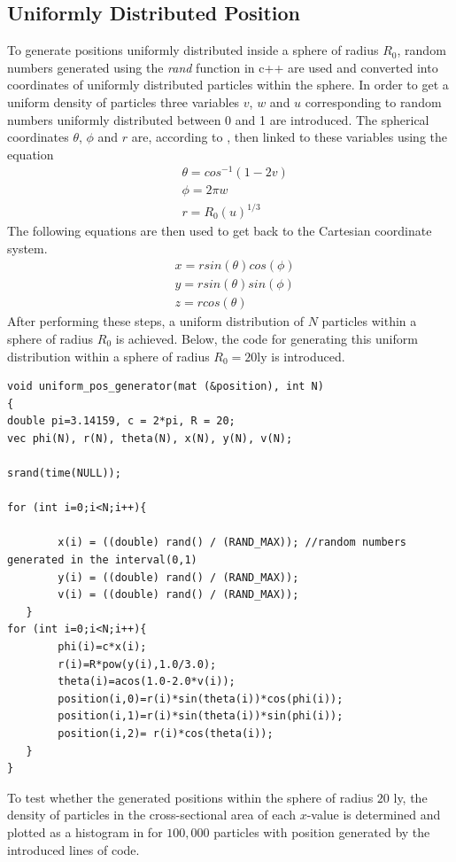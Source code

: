 \subsection{Uniformly Distributed Position}
To generate positions uniformly distributed inside a sphere of radius $R_0$, random numbers generated using the \textit{rand} function in c++ are used and converted into coordinates of uniformly distributed particles within the sphere. 
In order to get a uniform density of particles three variables $v$, $w$ and $u$ corresponding to random numbers uniformly distributed between 0 and 1 are introduced.
The spherical coordinates $\theta$, $\phi$ and $r$ are, according to \cite{AddNotesAstroUniDist}, then linked to these variables using the equation
\begin{align*}
	&\theta = cos^{-1}(1-2v)
	\\
	&\phi = 2\pi w
	\\	
	&r = R_0 (u)^{1/3}
\end{align*}                                            
The following equations are then used to get back to the Cartesian coordinate system.
\begin{align*}
	&x= rsin(\theta)cos(\phi)
	\\
    &y = r sin(\theta) sin(\phi)
    \\
    &z = r cos(\theta)
\end{align*}
After performing these steps, a uniform distribution of $N$ particles within a sphere of radius $R_0$ is achieved.
Below, the code for generating this uniform distribution within a sphere of radius $R_0 = 20 \text{ly}$ is introduced.
\begin{lstlisting}
void uniform_pos_generator(mat (&position), int N)
{
double pi=3.14159, c = 2*pi, R = 20;
vec phi(N), r(N), theta(N), x(N), y(N), v(N);

srand(time(NULL));

for (int i=0;i<N;i++){

        x(i) = ((double) rand() / (RAND_MAX)); //random numbers generated in the interval(0,1)
        y(i) = ((double) rand() / (RAND_MAX));
        v(i) = ((double) rand() / (RAND_MAX));
   }
for (int i=0;i<N;i++){
        phi(i)=c*x(i);
        r(i)=R*pow(y(i),1.0/3.0);
        theta(i)=acos(1.0-2.0*v(i));
        position(i,0)=r(i)*sin(theta(i))*cos(phi(i));
        position(i,1)=r(i)*sin(theta(i))*sin(phi(i));
        position(i,2)= r(i)*cos(theta(i));
   }
}
\end{lstlisting}
To test whether the generated positions within the sphere of radius $20$ ly, the density of particles in the cross-sectional area of each $x$-value is determined and plotted as a histogram in  for $100,000$ particles with position generated by the introduced lines of code.  
